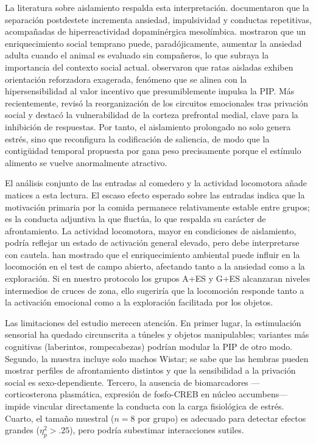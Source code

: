\documentclass[12pt,a4paper]{article}
\begin{document}
\begin{multicols}{2}
La literatura sobre aislamiento respalda esta interpretación. \citet{Fone2008} documentaron que la separación postdestete incrementa ansiedad, impulsividad y conductas repetitivas, acompañadas de hiperreactividad dopaminérgica mesolímbica. \citet{Branchi2006} mostraron que un enriquecimiento social temprano puede, paradójicamente, aumentar la ansiedad adulta cuando el animal es evaluado sin compañeros, lo que subraya la importancia del contexto social actual. \citet{Robbins1989} observaron que ratas aisladas exhiben orientación reforzadora exagerada, fenómeno que se alinea con la hipersensibilidad al valor incentivo que presumiblemente impulsa la PIP. Más recientemente, \citet{Arakawa2018} revisó la reorganización de los circuitos emocionales tras privación social y destacó la vulnerabilidad de la corteza prefrontal medial, clave para la inhibición de respuestas. Por tanto, el aislamiento prolongado no solo genera estrés, sino que reconfigura la codificación de saliencia, de modo que la contigüidad temporal propuesta por \citet{Killeen2013} gana peso precisamente porque el estímulo alimento se vuelve anormalmente atractivo.

El análisis conjunto de las entradas al comedero y la actividad locomotora añade matices a esta lectura. El escaso efecto esperado sobre las entradas indica que la motivación primaria por la comida permanece relativamente estable entre grupos; es la conducta adjuntiva la que fluctúa, lo que respalda su carácter de afrontamiento. La actividad locomotora, mayor en condiciones de aislamiento, podría reflejar un estado de activación general elevado, pero debe interpretarse con cautela. \citet{seibenhener2015use} han mostrado que el enriquecimiento ambiental puede influir en la locomoción en el test de campo abierto, afectando tanto a la ansiedad como a la exploración. Si en nuestro protocolo los grupos A+ES y G+ES alcanzaran niveles intermedios de cruces de zona, ello sugeriría que la locomoción responde tanto a la activación emocional como a la exploración facilitada por los objetos.

Las limitaciones del estudio merecen atención. En primer lugar, la estimulación sensorial ha quedado circunscrita a túneles y objetos manipulables; variantes más cognitivas (laberintos, rompecabezas) podrían modular la PIP de otro modo. Segundo, la muestra incluye solo machos Wistar; se sabe que las hembras pueden mostrar perfiles de afrontamiento distintos y que la sensibilidad a la privación social es sexo-dependiente. Tercero, la ausencia de biomarcadores —corticosterona plasmática, expresión de fosfo-CREB en núcleo accumbens— impide vincular directamente la conducta con la carga fisiológica de estrés. Cuarto, el tamaño muestral ($n = 8$ por grupo) es adecuado para detectar efectos grandes ($\eta^2_p > .25$), pero podría subestimar interacciones sutiles.


\end{multicols}
\end{document}
